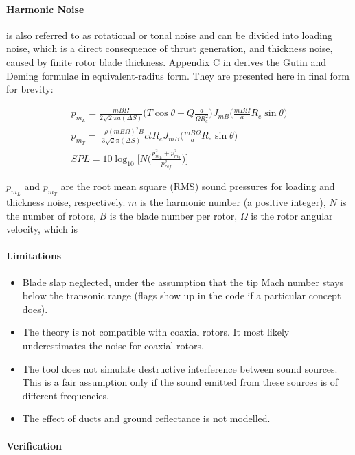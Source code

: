 \paragraph{Harmonic Noise} is also referred to as rotational or tonal noise and can be divided into loading noise, which is a direct consequence of thrust generation, and thickness noise, caused by finite rotor blade thickness. Appendix C in \cite{Brown2018} derives the Gutin and Deming formulae in equivalent-radius form. They are presented here in final form for brevity:

\begin{align}
    p_{m_L} = \frac{mB\Omega}{2\sqrt{2}\pi a (\Delta S)} \Big(T \cos \theta - Q \frac{a}{\Omega R_e^2} \Big) J_{mB}\Big(\frac{m B \Omega}{a} R_e \sin \theta \Big) \\
    p_{m_T} = \frac{-\rho (m B \Omega)^2 B}{3 \sqrt{2} \pi (\Delta S)} c t R_e J_{mB} \Big(\frac{m B \Omega}{a} R_e \sin \theta \Big) \\
    SPL = 10 \log_10 \bigg[N \bigg(\frac{p_{m_L}^2+p_{m_T}^2}{p_{ref}^2} \bigg) \bigg]
\end{align}

$p_{m_L}$ and $p_{m_T}$ are the root mean square (RMS) sound pressures for loading and thickness noise, respectively. $m$ is the harmonic number (a positive integer), $N$ is the number of rotors, $B$ is the blade number per rotor, $\Omega$ is the rotor angular velocity, which is 


\paragraph{Limitations}

\begin{itemize}
    \item Blade slap neglected, under the assumption that the tip Mach number stays below the transonic range (flags show up in the code if a particular concept does).
    \item The theory is not compatible with coaxial rotors. It most likely underestimates the noise for coaxial rotors. 
    \item The tool does not simulate destructive interference between sound sources. This is a fair assumption only if the sound emitted from these sources is of different frequencies.
    \item The effect of ducts and ground reflectance is not modelled.
\end{itemize}
 
\paragraph{Verification}

